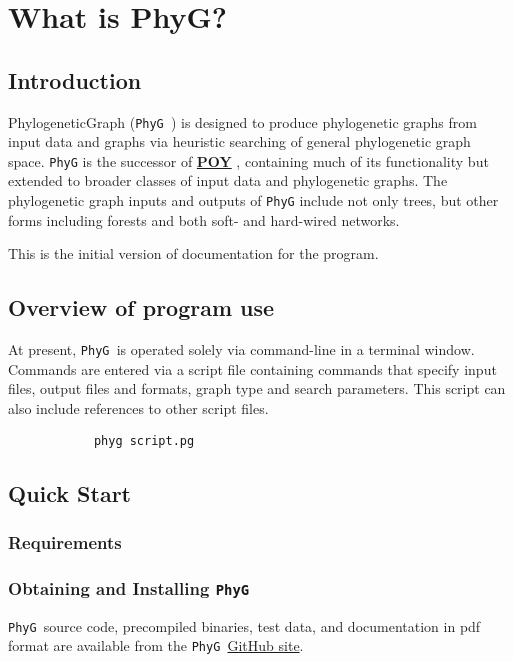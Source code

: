 \documentclass[11pt]{book}
\newcommand{\phyg}{\texttt{PhyG }}
\begin{document}
\chapter{What is PhyG?}
	\section{Introduction}
	PhylogeneticGraph (\phyg) is designed to produce phylogenetic graphs from input data and 
	graphs via heuristic searching of general phylogenetic graph space. \texttt{PhyG} 
	is the successor of \href{https://github.com/wardwheeler/POY5}{\textbf{POY}}
	\citep{POY2,POY3,POY4,Varonetal2010,POY5, Wheeleretal2015}, containing much of its 
	functionality but extended to broader classes of input data and phylogenetic graphs. The 
	phylogenetic graph inputs and outputs of \texttt{PhyG} include not only trees, but other 
	forms including forests and both soft- and hard-wired networks.
		
	This is the initial version of documentation for the program.
	
	\section{Overview of program use}
	At present, \phyg is operated solely via command-line in a terminal window. %
	Commands are entered via a script file containing commands that specify input files, output files 
	and formats, graph type and search parameters. This script can also include references to other 
	script files.
				
		\begin{verbatim}
			phyg script.pg
		\end{verbatim}
	
	\section{Quick Start}
		\subsection{Requirements}
		\subsection{Obtaining and Installing \phyg}
		\phyg source code, precompiled binaries, test data, and documentation in pdf format are available 
		from the \phyg \href{https://githib.com/wardwheeler/PhyGraph}{GitHub site}.
\end{document}
